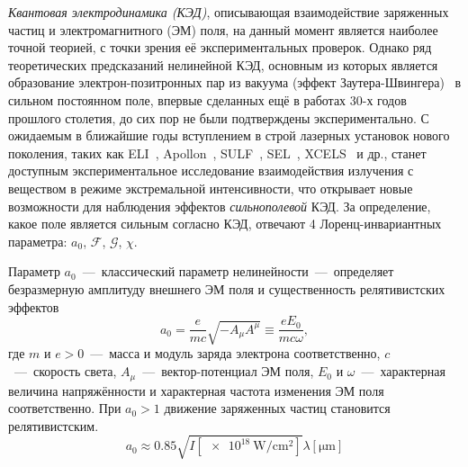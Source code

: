 
{\actuality} 

\textit{Квантовая электродинамика (КЭД)}, описывающая взаимодействие заряженных частиц и электромагнитного (ЭМ) поля, на данный момент является наиболее точной теорией, с точки зрения её экспериментальных проверок.
Однако ряд теоретических предсказаний нелинейной КЭД, основным из которых является образование электрон-позитронных пар из вакуума (эффект Заутера-Швингера)~\cite{Sauter31, Schwinger51} в сильном постоянном поле, впервые сделанных ещё в работах 30-х годов прошлого столетия, до сих пор не были подтверждены экспериментально.
С ожидаемым в ближайшие годы вступлением в строй лазерных установок нового поколения, таких как ELI~\cite{ELI}, Apollon~\cite{zou2015design}, SULF~\cite{SULF}, SEL~\cite{SEL}, XCELS~\cite{XCELS} и др., станет доступным экспериментальное исследование взаимодействия излучения с веществом в режиме экстремальной интенсивности, что открывает новые возможности для наблюдения эффектов \textit{сильнополевой} КЭД.
За определение, какое поле является сильным согласно КЭД, отвечают 4 Лоренц-инвариантных параметра: $a_0$, $\mathcal{F}$, $\mathcal{G}$, $\chi$.

Параметр $a_0$~---~классический параметр нелинейности~---~определяет безразмерную амплитуду внешнего ЭМ поля и существенность релятивистских эффектов
\begin{equation}
    a_0  = \frac{e}{mc}\sqrt{-A_\mu A^\mu} \equiv \frac{eE_0}{m c \omega},
\end{equation}
где $m$ и $e>0$~---~масса и модуль заряда электрона соответственно, $c$~---~скорость света, $A_\mu$~---~вектор-потенциал ЭМ поля, $E_0$ и $\omega$~---~характерная величина напряжённости и характерная частота изменения ЭМ поля соответственно.
При $a_0 > 1$ движение заряженных частиц становится релятивистским.
\begin{equation}
  a_0 \approx 0.85 \sqrt{I[\SI{e18}{\watt/\centi\meter^2}]}\lambda[\si{\um}]
\end{equation}

